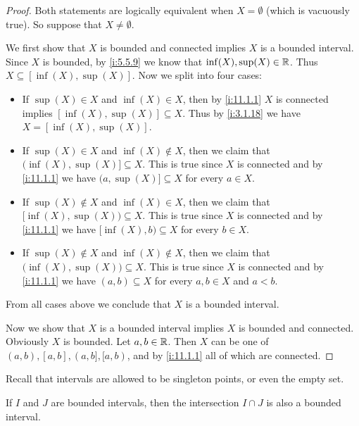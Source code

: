 \begin{proof}
  Both statements are logically equivalent when \(X = \emptyset\) (which is vacuously true).
  So suppose that \(X \neq \emptyset\).

  We first show that \(X\) is bounded and connected implies \(X\) is a bounded interval.
  Since \(X\) is bounded, by \cref{i:5.5.9} we know that \(\inf(X), \sup(X) \in \mathbb{R}\).
  Thus \(X \subseteq [\inf(X), \sup(X)]\).
  Now we split into four cases:
  \begin{itemize}
    \item If \(\sup(X) \in X\) and \(\inf(X) \in X\), then by \cref{i:11.1.1} \(X\) is connected implies \([\inf(X), \sup(X)] \subseteq X\).
          Thus by \cref{i:3.1.18} we have \(X = [\inf(X), \sup(X)]\).
    \item If \(\sup(X) \in X\) and \(\inf(X) \notin X\), then we claim that \(\big(\inf(X), \sup(X)] \subseteq X\).
          This is true since \(X\) is connected and by \cref{i:11.1.1} we have \(\big(a, \sup(X)] \subseteq X\) for every \(a \in X\).
    \item If \(\sup(X) \notin X\) and \(\inf(X) \in X\), then we claim that \([\inf(X), \sup(X)\big) \subseteq X\).
          This is true since \(X\) is connected and by \cref{i:11.1.1} we have \([\inf(X), b\big) \subseteq X\) for every \(b \in X\).
    \item If \(\sup(X) \notin X\) and \(\inf(X) \notin X\), then we claim that \(\big(\inf(X), \sup(X)\big) \subseteq X\).
          This is true since \(X\) is connected and by \cref{i:11.1.1} we have \((a, b) \subseteq X\) for every \(a, b \in X\) and \(a < b\).
  \end{itemize}
  From all cases above we conclude that \(X\) is a bounded interval.

  Now we show that \(X\) is a bounded interval implies \(X\) is bounded and connected.
  Obviously \(X\) is bounded.
  Let \(a, b \in \mathbb{R}\).
  Then \(X\) can be one of \((a, b), [a, b], (a, b], [a, b)\), and by \cref{i:11.1.1} all of which are connected.
\end{proof}

\begin{rmk}\label{i:11.1.5}
  Recall that intervals are allowed to be singleton points, or even the empty set.
\end{rmk}

\begin{cor}\label{i:11.1.6}
  If \(I\) and \(J\) are bounded intervals, then the intersection \(I \cap J\) is also a bounded interval.
\end{cor}

